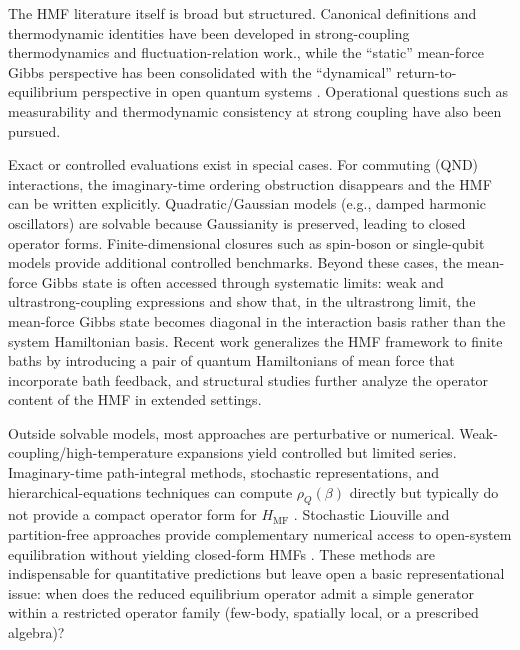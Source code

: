 The HMF literature itself is broad but structured. Canonical definitions and
thermodynamic identities have been developed in strong-coupling thermodynamics and
fluctuation-relation work\cite{campisiFluctuationTheoremArbitrary2009,jarzynskiNonequilibriumWorkTheorem2004,seifertFirstSecondLaw2016,talknerColloquiumStatisticalMechanics2020}., while the ``static'' mean-force Gibbs perspective has been consolidated with the ``dynamical'' return-to-equilibrium perspective in open quantum systems \cite{trushechkinOpenQuantumSystem2022}. Operational questions such as measurability and thermodynamic consistency at strong coupling have also been pursued\cite{strasbergMeasurabilityNonequilibriumThermodynamics2020,rivasStrongCouplingThermodynamics2020}.

Exact or controlled evaluations exist in special cases. For commuting (QND)
interactions, the imaginary-time ordering obstruction disappears and the HMF can
be written explicitly\cite{campisiTalknerHanggi2009Solvable}. Quadratic/Gaussian
models (e.g., damped harmonic oscillators) are solvable because Gaussianity is
preserved, leading to closed operator forms\cite{caldeiraQuantumTunnellingDissipative1983a,grabertQuantumBrownianMotion1988,hiltHamiltonianMeanForce2011}.
Finite-dimensional closures such as spin-boson or single-qubit models provide
additional controlled benchmarks\cite{leggettDynamicsDissipativeTwostate1987}.
Beyond these cases, the mean-force Gibbs state is often accessed through
systematic limits: weak and ultrastrong-coupling expressions and show that, in the ultrastrong limit, the mean-force Gibbs state becomes diagonal in the interaction basis rather than the system Hamiltonian basis\cite{cresserWeakUltrastrongCoupling2021a}. Recent work generalizes the HMF framework to finite baths by introducing a pair of quantum Hamiltonians of mean
force that incorporate bath feedback\cite{duGeneralizedHamiltonianMeanforce2025a},
and structural studies further analyze the operator content of the HMF in
extended settings\cite{burkeStructureHamiltonianMean2024}.

Outside solvable models, most approaches are perturbative or numerical.
Weak-coupling/high-temperature expansions yield controlled but limited
series\cite{cresserWeakUltrastrongCoupling2021a}. Imaginary-time path-integral
methods, stochastic representations, and hierarchical-equations techniques can
compute $\rho_Q(\beta)$ directly but typically do not provide a compact operator
form for $H_{\mathrm{MF}}$ \cite{moixEquilibriumreducedDensityMatrix2012,chenRigorousStochasticMatrix2014,makriExploitingClassicalDecoherence2014,tanimuraReducedHierarchicalEquations2014,songCalculationCorrelatedInitial2015}.
Stochastic Liouville and partition-free approaches provide complementary
numerical access to open-system equilibration without yielding closed-form HMFs
\cite{stockburgerSimulatingSpinbosonDynamics2004,mccaulPartitionfreeApproachOpen2017c}.
These methods are indispensable for quantitative predictions but leave open a
basic representational issue: when does the reduced equilibrium operator admit a
simple generator within a restricted operator family (few-body, spatially local,
or a prescribed algebra)?

